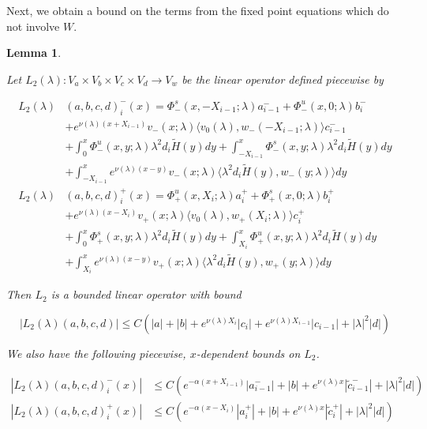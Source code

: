 \documentclass[12pt]{article}
\newtheorem{lemma}{Lemma}
\begin{document}
Next, we obtain a bound on the terms from the fixed point equations which do not involve $W$. 


\begin{lemma}\label{L2}

Let $L_2(\lambda): V_a \times V_b \times V_c \times V_d \rightarrow V_w$ be the linear operator defined piecewise by

\begin{align*}
L_2(\lambda)&(a,b,c,d)_i^-(x) = \Phi^s_-(x, -X_{i-1}; \lambda)a_{i-1}^- + \Phi^u_-(x, 0; \lambda)b_i^- \\
&+ e^{\nu(\lambda)(x+X_{i-1})} v_-(x; \lambda) \langle v_0(\lambda), w_-(-X_{i-1}; \lambda) \rangle c_{i-1}^- \\
&+ \int_0^x \Phi^u_-(x, y; \lambda)\lambda^2 d_i \tilde{H}(y) dy + \int_{-X_{i-1}}^x \Phi^s_-(x, y; \lambda) \lambda^2 d_i \tilde{H}(y) dy \\
&+ \int_{-X_{i-1}}^x
e^{\nu(\lambda)(x-y)} v_-(x; \lambda) \langle \lambda^2 d_i \tilde{H}(y), w_-(y; \lambda) \rangle dy \\
L_2(\lambda)&(a,b,c,d)_i^+(x) = \Phi^u_+(x, X_i; \lambda)a_i^+ + \Phi^s_+(x, 0; \lambda)b_i^+ \\
&+ e^{\nu(\lambda)(x - X_i)} v_+(x; \lambda) \langle v_0(\lambda), w_+(X_i; \lambda) \rangle c_i^+ \\
&+ \int_0^x \Phi^s_+(x, y; \lambda) \lambda^2 d_i \tilde{H}(y) dy + \int_{X_i}^x \Phi^u_+(x, y; \lambda) \lambda^2 d_i \tilde{H}(y) dy \\
&+ \int_{X_i}^x e^{\nu(\lambda)(x-y)} v_+(x; \lambda) \langle \lambda^2 d_i \tilde{H}(y), w_+(y; \lambda) \rangle dy
\end{align*}

Then $L_2$ is a bounded linear operator with bound

\begin{equation}\label{L2bound}
|L_2(\lambda)(a,b,c,d)| \leq C (|a| + |b| + e^{\nu(\lambda)X_i}|c_i| + e^{\nu(\lambda)X_{i-1}}|c_{i-1}| + |\lambda|^2 |d| )
\end{equation}

We also have the following piecewise, $x$-dependent bounds on $L_2$.

\begin{align*}
|L_2(\lambda)(a,b,c,d)_i^-(x)| &\leq C (e^{-\alpha(x + X_{i-1})}|a_{i-1}^-| + |b| + e^{\nu(\lambda)x} |\tilde{c}_{i-1}^-| + |\lambda|^2 |d| ) \\
|L_2(\lambda)(a,b,c,d)_i^+(x)| &\leq C (e^{-\alpha(x - X_i)}|a_i^+| + |b| + e^{\nu(\lambda)x} |\tilde{c}_i^+| + |\lambda|^2 |d| ) 
\end{align*}


\end{lemma}
\end{document}
